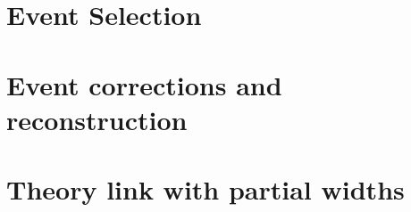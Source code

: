 \documentclass[a4paper,12pt]{book}
\begin{document}
\chapter{Event Selection}
%

\chapter{Event corrections and reconstruction}
%

\chapter{Theory link with partial widths}

\end{document}
